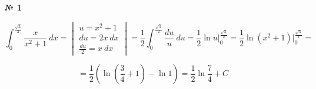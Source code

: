 \documentclass{article}
\begin{document}
\textbf{№ 1} 
\large

$$ \int_{0}^{\frac{\sqrt{3}}{2}} \frac{x}{x^2+1} \ dx 
= \begin{vmatrix} u = x^2+1 \\
                 du = 2x \ dx \\
                 \frac{du}{2} = x \ dx \end{vmatrix}
= \frac{1}{2} \int_{0}^{\frac{\sqrt{3}}{2}} \frac{du}{u} \ du
= \frac{1}{2} \ln{u} \bigg\vert_{0}^{\frac{\sqrt{3}}{2}}
= \frac{1}{2} \ln{(x^2+1)} \bigg\vert_{0}^{\frac{\sqrt{3}}{2}} 
= $$

$$ = \frac{1}{2} \left( \ln{(\frac{3}{4} + 1)} - \ln{1}  \right)
= \frac{1}{2} \ln{\frac{7}{4}} + C $$
\end{document}
